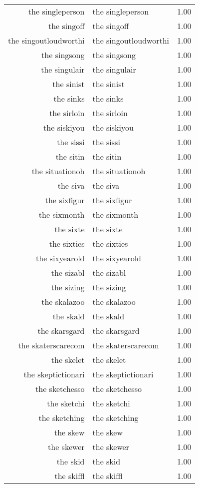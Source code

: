 \begin{table}[ht]
\begin{tabular}{rlr}
  the singleperson & the singleperson & 1.00 \\ 
  the singoff & the singoff & 1.00 \\ 
  the singoutloudworthi & the singoutloudworthi & 1.00 \\ 
  the singsong & the singsong & 1.00 \\ 
  the singulair & the singulair & 1.00 \\ 
  the sinist & the sinist & 1.00 \\ 
  the sinks & the sinks & 1.00 \\ 
  the sirloin & the sirloin & 1.00 \\ 
  the siskiyou & the siskiyou & 1.00 \\ 
  the sissi & the sissi & 1.00 \\ 
  the sitin & the sitin & 1.00 \\ 
  the situationoh & the situationoh & 1.00 \\ 
  the siva & the siva & 1.00 \\ 
  the sixfigur & the sixfigur & 1.00 \\ 
  the sixmonth & the sixmonth & 1.00 \\ 
  the sixte & the sixte & 1.00 \\ 
  the sixties & the sixties & 1.00 \\ 
  the sixyearold & the sixyearold & 1.00 \\ 
  the sizabl & the sizabl & 1.00 \\ 
  the sizing & the sizing & 1.00 \\ 
  the skalazoo & the skalazoo & 1.00 \\ 
  the skald & the skald & 1.00 \\ 
  the skarsgard & the skarsgard & 1.00 \\ 
  the skaterscarecom & the skaterscarecom & 1.00 \\ 
  the skelet & the skelet & 1.00 \\ 
  the skeptictionari & the skeptictionari & 1.00 \\ 
  the sketchesso & the sketchesso & 1.00 \\ 
  the sketchi & the sketchi & 1.00 \\ 
  the sketching & the sketching & 1.00 \\ 
  the skew & the skew & 1.00 \\ 
  the skewer & the skewer & 1.00 \\ 
  the skid & the skid & 1.00 \\ 
  the skiffl & the skiffl & 1.00 \\ 

\end{tabular}
\end{table}
